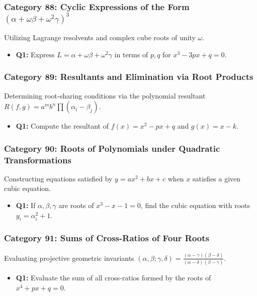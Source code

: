 \documentclass[10pt,a4paper]{article}
\begin{document}
\subsubsection{Category 88: Cyclic Expressions of the Form $(\alpha + \omega \beta + \omega^2 \gamma)^3$}
Utilizing Lagrange resolvents and complex cube roots of unity $\omega$.
\begin{itemize}[leftmargin=*]
    \item \textbf{Q1:} Express $L = \alpha + \omega \beta + \omega^2 \gamma$ in terms of $p, q$ for $x^3 - 3px + q = 0$.
\end{itemize}

\subsubsection{Category 89: Resultants and Elimination via Root Products}
Determining root-sharing conditions via the polynomial resultant $R(f,g) = a^m b^n \prod (\alpha_i - \beta_j)$.
\begin{itemize}[leftmargin=*]
    \item \textbf{Q1:} Compute the resultant of $f(x) = x^2 - px + q$ and $g(x) = x - k$.
\end{itemize}

\subsubsection{Category 90: Roots of Polynomials under Quadratic Transformations}
Constructing equations satisfied by $y = ax^2 + bx + c$ when $x$ satisfies a given cubic equation.
\begin{itemize}[leftmargin=*]
    \item \textbf{Q1:} If $\alpha, \beta, \gamma$ are roots of $x^3 - x - 1 = 0$, find the cubic equation with roots $y_i = \alpha_i^2 + 1$.
\end{itemize}

\subsubsection{Category 91: Sums of Cross-Ratios of Four Roots}
Evaluating projective geometric invariants $(\alpha, \beta; \gamma, \delta) = \frac{(\alpha-\gamma)(\beta-\delta)}{(\alpha-\delta)(\beta-\gamma)}$.
\begin{itemize}[leftmargin=*]
    \item \textbf{Q1:} Evaluate the sum of all cross-ratios formed by the roots of $x^4 + px + q = 0$.
\end{itemize}
\end{document}
